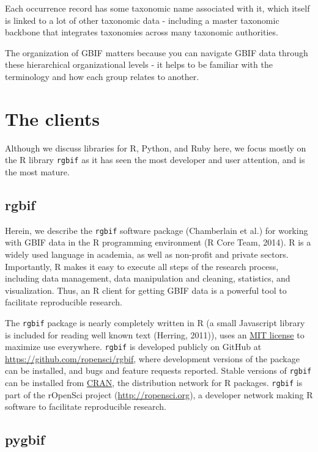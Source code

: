 \documentclass[author-year, review, 11pt]{components/elsarticle} %
\begin{document}
Each occurrence record has some taxonomic name associated with it, which
itself is linked to a lot of other taxonomic data - including a master
taxonomic backbone that integrates taxonomies across many taxonomic
authorities.

The organization of GBIF matters because you can navigate GBIF data
through these hierarchical organizational levels - it helps to be
familiar with the terminology and how each group relates to another.

\section{The clients}\label{the-clients}

Although we discuss libraries for R, Python, and Ruby here, we focus
mostly on the R library \texttt{rgbif} as it has seen the most developer
and user attention, and is the most mature.

\subsection{rgbif}\label{rgbif}

Herein, we describe the \texttt{rgbif} software package (Chamberlain et
al.) for working with GBIF data in the R programming environment (R Core
Team, 2014). R is a widely used language in academia, as well as
non-profit and private sectors. Importantly, R makes it easy to execute
all steps of the research process, including data management, data
manipulation and cleaning, statistics, and visualization. Thus, an R
client for getting GBIF data is a powerful tool to facilitate
reproducible research.

The \texttt{rgbif} package is nearly completely written in R (a small
Javascript library is included for reading well known text (Herring,
2011)), uses an \href{http://choosealicense.com/licenses/mit/}{MIT
license} to maximize use everywhere. \texttt{rgbif} is developed
publicly on GitHub at \url{https://github.com/ropensci/rgbif}, where
development versions of the package can be installed, and bugs and
feature requests reported. Stable versions of \texttt{rgbif} can be
installed from
\href{https://cran.rstudio.com/web/packages/rgbif/}{CRAN}, the
distribution network for R packages. \texttt{rgbif} is part of the
rOpenSci project (\url{http://ropensci.org}), a developer network making
R software to facilitate reproducible research.

\subsection{pygbif}\label{pygbif}
\end{document}

